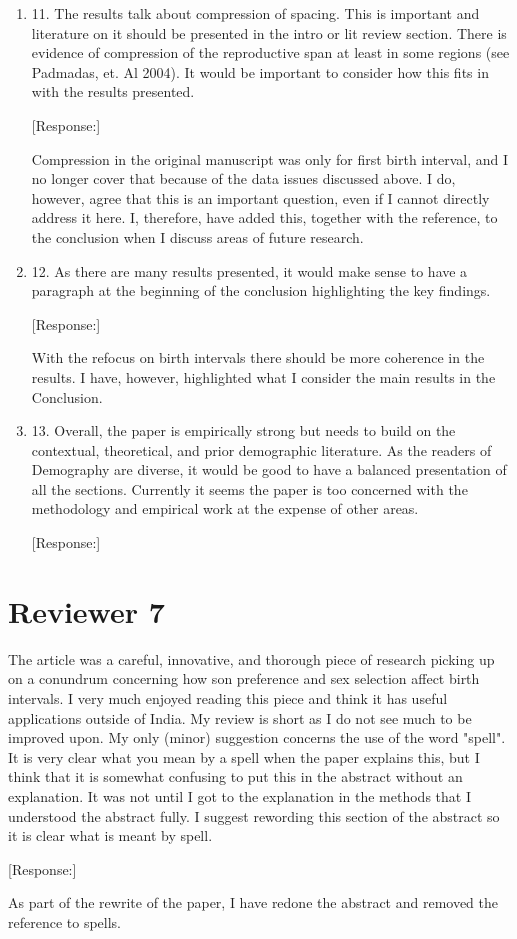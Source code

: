 \documentclass[letterpaper,12pt]{article}
\begin{document}
\begin{enumerate}
\item 11. The results talk about compression of spacing. This is important and
literature on it should be presented in the intro or lit review section.
There is evidence of compression of the reproductive span at least in
some regions (see Padmadas, et. Al 2004). It would be important to
consider how this fits in with the results presented.

[Response:]

Compression in the original manuscript was only for first birth interval, and I no longer 
cover that because of the data issues discussed above.
I do, however, agree that this is an important question, even if I cannot directly
address it here.
I, therefore, have added this, together with the reference, to the conclusion when I 
discuss areas of future research.


\item 12. As there are many results presented, it would make sense to have a
paragraph at the beginning of the conclusion highlighting the key
findings.

[Response:]

With the refocus on birth intervals there should be more coherence in the results.
I have, however, highlighted what I consider the main results in the Conclusion.



\item 13. Overall, the paper is empirically strong but needs to build on the
contextual, theoretical, and prior demographic literature. As the
readers of Demography are diverse, it would be good to have a balanced
presentation of all the sections. Currently it seems the paper is too
concerned with the methodology and empirical work at the expense of
other areas.

[Response:]



\end{enumerate}

\newpage

\section*{Reviewer 7}

The article was a careful, innovative, and thorough piece of research
picking up on a conundrum concerning how son preference and sex
selection affect birth intervals. I very much enjoyed reading this piece
and think it has useful applications outside of India.  My review is
short as I do not see much to be improved upon.  My only (minor)
suggestion concerns the use of the word "spell".  It is very clear what
you mean by a spell when the paper explains this, but I think that it is
somewhat confusing to put this in the abstract without an explanation. 
It was not until I got to the explanation in the methods that I
understood the abstract fully.  I suggest rewording this section of the
abstract so it is clear what is meant by spell.

[Response:]

As part of the rewrite of the paper, I have redone the abstract and removed the
reference to spells.


\newpage


\end{document}
